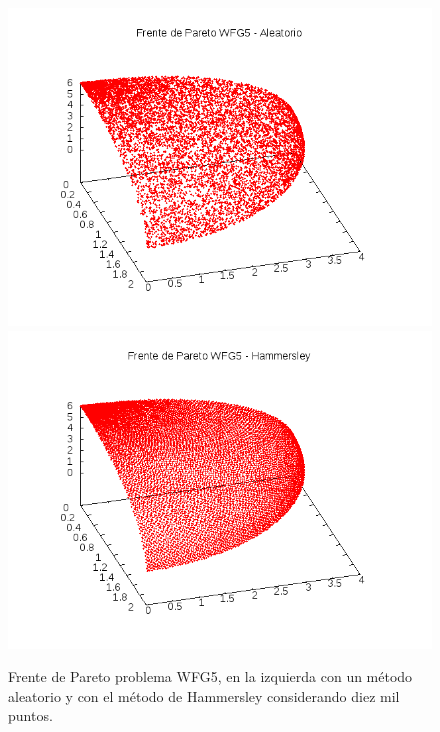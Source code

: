 \begin{figure}[H]
\centering
\scriptsize
\includegraphics[scale=0.35]
{Figures_Chapter2/Random.png}
\includegraphics[scale=0.35]
{Figures_Chapter2/Hammersley.png}
\caption{Frente de Pareto problema WFG5, en la izquierda con un método aleatorio y con el método de Hammersley considerando diez mil puntos.}
\label{fig:Random}
\end{figure}



